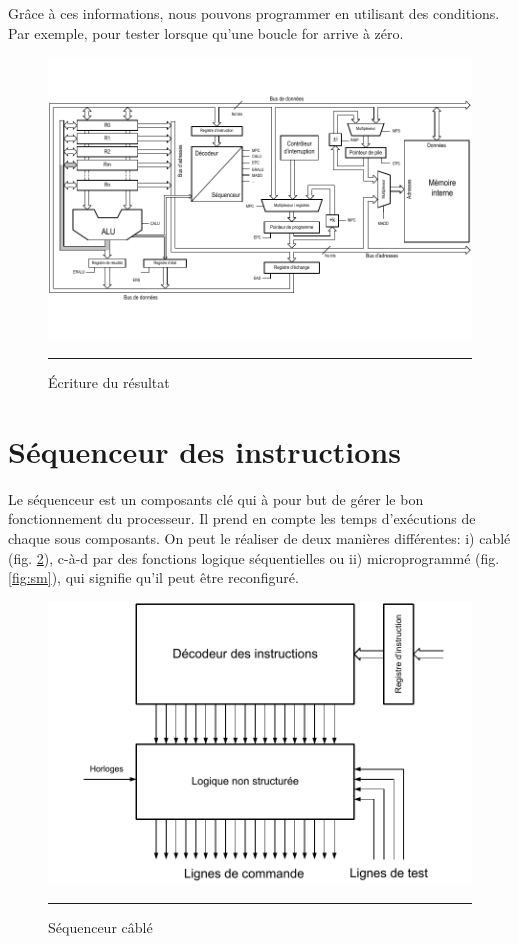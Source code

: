 Grâce à ces informations, nous pouvons programmer en utilisant des conditions. Par exemple, pour tester lorsque qu'une boucle for arrive à zéro.

\begin{figure}[htb]
  \centering
  \includegraphics[angle=0, width=15cm, trim=0 30 0 30,clip]{./Figures/cpu/instruction5.pdf}
  \rule{35em}{0.5pt}
  \caption[instr5]{Écriture du résultat}
  \label{fig:instr5}
\end{figure}

\newpage
\section{Séquenceur des instructions}
Le séquenceur est un composants clé qui à pour but de gérer le bon fonctionnement du processeur. Il prend en compte les temps d'exécutions de chaque sous composants. On peut le réaliser de deux manières différentes: i) cablé (fig. \ref{fig:sc}), c-à-d par des fonctions logique séquentielles ou ii) microprogrammé (fig. \ref{fig:sm}), qui signifie qu'il peut être reconfiguré.
 
\begin{figure}[htb]
  \centering
  \includegraphics[angle=0, width=12cm]{./Figures/cpu/Sequenceur1.pdf}
  \rule{35em}{0.5pt}
  \caption[sc]{Séquenceur câblé}
  \label{fig:sc}
\end{figure}


